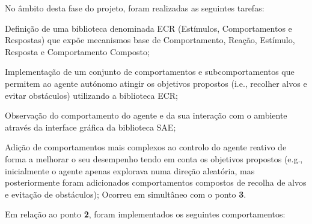 No âmbito desta fase do projeto, foram realizadas as seguintes tarefas:

\begin{boldenumerate}
    \item Definição de uma biblioteca denominada ECR (Estímulos, Comportamentos e Respostas) que expõe mecanismos base de Comportamento, Reação, Estímulo, Resposta e Comportamento Composto;
    \item Implementação de um conjunto de comportamentos e subcomportamentos que permitem ao agente autónomo atingir os objetivos propostos (i.e., recolher alvos e evitar obstáculos) utilizando a biblioteca ECR;
    \item Observação do comportamento do agente e da sua interação com o ambiente através da interface gráfica da biblioteca SAE;
    \item Adição de comportamentos mais complexos ao controlo do agente reativo de forma a melhorar o seu desempenho tendo em conta os objetivos propostos (e.g., inicialmente o agente apenas explorava numa direção aleatória, mas posteriormente foram adicionados comportamentos compostos de recolha de alvos e evitação de obstáculos); Ocorreu em simultâneo com o ponto \textbf{3}.
\end{boldenumerate}

Em relação ao ponto \textbf{2}, foram implementados os seguintes comportamentos:

